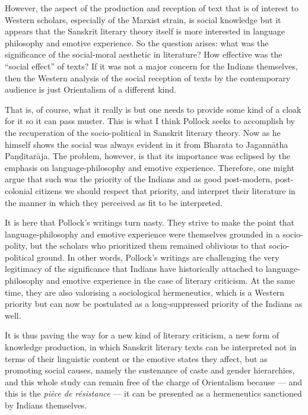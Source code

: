 However, the aspect of the production and reception of text that is of interest to Western scholars, especially of the Marxist strain, is social knowledge but it appears that the Sanskrit literary theory itself is more interested in language philosophy and emotive experience. So the question arises: what was the significance of the social-moral aesthetic in literature? How effective was the ``social effect'' of texts? If it was not a major concern for the Indians themselves, then the Western analysis of the social reception of texts by the contemporary audience is just Orientalism of a different kind.

That is, of course, what it really is but one needs to provide some kind of a cloak for it so it can pass muster. This is what I think Pollock seeks to accomplish by the recuperation of the socio-political in Sanskrit literary theory. Now as he himself shows the social was always evident in it from Bharata to Jagannātha Paṇḍitarāja. The problem, however, is that its importance was eclipsed by the emphasis on language-philosophy and emotive experience. Therefore, one might argue that such was the priority of the Indians and as good post-modern, post-colonial citizens we should respect that priority, and interpret their literature in the manner in which they perceived as fit to be interpreted. 

\newpage

It is here that Pollock's writings turn nasty. They strive to make the point that language-philosophy and emotive experience were themselves grounded in a socio-polity, but the scholars who prioritized them remained oblivious to that socio-political ground. In other words, Pollock's writings are challenging the very legitimacy of the significance that Indians have historically attached to language-philosophy and emotive experience in the case of literary criticism. At the same time, they are also valorising a sociological hermeneutics, which is a Western priority but can now be postulated as a long-suppressed priority of the Indians as well. 

It is thus paving the way for a new kind of literary criticism, a new form of knowledge production, in which Sanskrit literary texts can be interpreted not in terms of their linguistic content or the emotive states they affect, but as promoting social causes, namely the sustenance of caste and gender hierarchies, and this whole study can remain free of the charge of Orientalism because --- and this is the \textsl{pièce de résistance} --- it can be presented as a hermeneutics sanctioned by Indians themselves.

